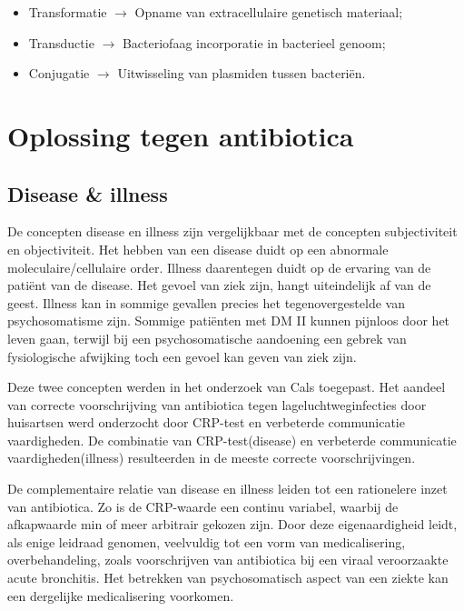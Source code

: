 \documentclass[twocolumn]{scrartcl}
\begin{document}
\begin{itemize}
    \item Transformatie $\rightarrow$ Opname van extracellulaire genetisch materiaal;
    \item Transductie $\rightarrow$ Bacteriofaag incorporatie in bacterieel genoom;
    \item Conjugatie $\rightarrow$ Uitwisseling van plasmiden tussen bacteriën.
\end{itemize}

\section*{Oplossing tegen antibiotica}
\subsection*{Disease \& illness}
De concepten disease en illness zijn vergelijkbaar met de concepten subjectiviteit en objectiviteit. Het hebben van een disease duidt op een abnormale moleculaire/cellulaire order. Illness daarentegen duidt op de ervaring van de patiënt van de disease. Het gevoel van ziek zijn, hangt uiteindelijk af van de geest. Illness kan in sommige gevallen precies het tegenovergestelde van psychosomatisme zijn. Sommige patiënten met DM II kunnen pijnloos door het leven gaan, terwijl bij een psychosomatische aandoening een gebrek van fysiologische afwijking toch een gevoel kan geven van ziek zijn.

Deze twee concepten werden in het onderzoek van Cals toegepast. Het aandeel van correcte voorschrijving van antibiotica tegen lageluchtweginfecties door huisartsen werd onderzocht door CRP-test en verbeterde communicatie vaardigheden. De combinatie van CRP-test(disease) en verbeterde communicatie vaardigheden(illness) resulteerden in de meeste correcte voorschrijvingen.

De complementaire relatie van disease en illness leiden tot een rationelere inzet van antibiotica. Zo is de CRP-waarde een continu variabel, waarbij de afkapwaarde min of meer arbitrair gekozen zijn. Door deze eigenaardigheid leidt, als enige leidraad genomen, veelvuldig tot een vorm van medicalisering, overbehandeling, zoals voorschrijven van antibiotica bij een viraal veroorzaakte acute bronchitis. Het betrekken van psychosomatisch aspect van een ziekte kan een dergelijke medicalisering voorkomen.
\nocite{*}
\printbibliography
\end{document}
